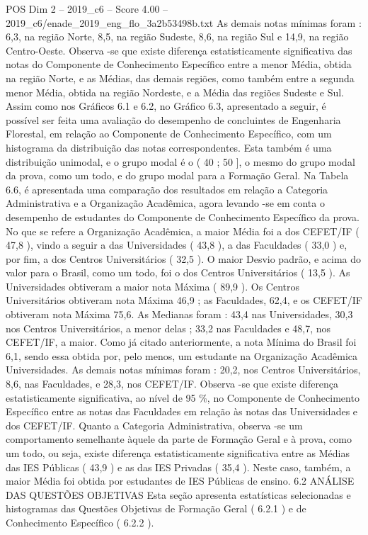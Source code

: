 \begin{textsample}{POS Dim 2 – 2019\_c6 – Score 4.00 – 2019\_c6/enade\_2019\_eng\_flo\_3a2b53498b.txt}
As demais notas mínimas foram : 6,3, na região Norte, 8,5, na região Sudeste, 8,6, na região Sul e 14,9, na região Centro-Oeste.
Observa -se que existe diferença estatisticamente significativa das notas do Componente de Conhecimento Específico entre a menor Média, obtida na região Norte, e as Médias, das demais regiões, como também entre a segunda menor Média, obtida na região Nordeste, e a Média das regiões Sudeste e Sul.
Assim como nos Gráficos 6.1 e 6.2, no Gráfico 6.3, apresentado a seguir, é possível ser feita uma avaliação do desempenho de concluintes de Engenharia Florestal, em relação ao Componente de Conhecimento Específico, com um histograma da distribuição das notas correspondentes.
Esta também é uma distribuição unimodal, e o grupo modal é o ( 40 ; 50 ], o mesmo do grupo modal da prova, como um todo, e do grupo modal para a Formação Geral.
Na Tabela 6.6, é apresentada uma comparação dos resultados em relação a Categoria Administrativa e a Organização Acadêmica, agora levando -se em conta o desempenho de estudantes do Componente de Conhecimento Específico da prova.
No que se refere a Organização Acadêmica, a maior Média foi a dos CEFET/IF ( 47,8 ), vindo a seguir a das Universidades ( 43,8 ), a das Faculdades ( 33,0 ) e, por fim, a dos Centros Universitários ( 32,5 ).
O maior Desvio padrão, e acima do valor para o Brasil, como um todo, foi o dos Centros Universitários ( 13,5 ).
As Universidades obtiveram a maior nota Máxima ( 89,9 ).
Os Centros Universitários obtiveram nota Máxima 46,9 ; as Faculdades, 62,4, e os CEFET/IF obtiveram nota Máxima 75,6.
As Medianas foram : 43,4 nas Universidades, 30,3 nos Centros Universitários, a menor delas ; 33,2 nas Faculdades e 48,7, nos CEFET/IF, a maior.
Como já citado anteriormente, a nota Mínima do Brasil foi 6,1, sendo essa obtida por, pelo menos, um estudante na Organização Acadêmica Universidades.
As demais notas mínimas foram : 20,2, nos Centros Universitários, 8,6, nas Faculdades, e 28,3, nos CEFET/IF.
Observa -se que existe diferença estatisticamente significativa, ao nível de 95 \%, no Componente de Conhecimento Específico entre as notas das Faculdades em relação às notas das Universidades e dos CEFET/IF.
Quanto a Categoria Administrativa, observa -se um comportamento semelhante àquele da parte de Formação Geral e à prova, como um todo, ou seja, existe diferença estatisticamente significativa entre as Médias das IES Públicas ( 43,9 ) e as das IES Privadas ( 35,4 ).
Neste caso, também, a maior Média foi obtida por estudantes de IES Públicas de ensino. 6.2 ANÁLISE DAS QUESTÕES OBJETIVAS Esta seção apresenta estatísticas selecionadas e histogramas das Questões Objetivas de Formação Geral ( 6.2.1 ) e de Conhecimento Específico ( 6.2.2 ).

\end{textsample}
